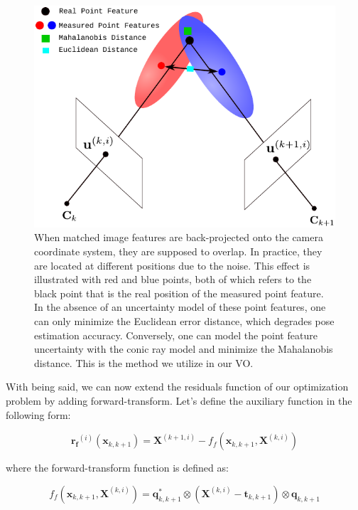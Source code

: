 \documentclass[12pt]{report}
\numberwithin{figure}{section}
\begin{document}
\begin{figure}[H] \centering
\includegraphics[width=0.9\linewidth,natwidth=640,natheight=640]
{fig/drawings/feature_uncertainty.pdf} \caption[Pose Estimation With Feature
Uncertainty] {When matched image features are back-projected onto the camera
coordinate system, they are supposed to overlap. In practice, they are located
at different positions due to the noise. This effect is illustrated with red
and blue points, both of which refers to the black point that is the real
position of the measured point feature. In the absence of an uncertainty model
of these point features, one can only minimize the Euclidean error distance,
which degrades pose estimation accuracy. Conversely, one can model the point
feature uncertainty with the conic ray model and minimize the Mahalanobis
distance. This is the method we utilize in our VO.} \label{fig:min_mahalanobis}
\end{figure}

With being said, we can now extend the residuals function of our optimization
problem by adding forward-transform.  Let's define the auxiliary function in 
the
following form:

\begin{equation} \mathbf{r_{f}}^{(i)}(\mathbf{x}_{k,k+1}) =
\mathbf{X}^{(k+1,i)} - f_f(\mathbf{x}_{k,k+1}, \mathbf{X}^{(k,i)})
\end{equation}

where the forward-transform function is defined as:

\begin{equation} f_f(\mathbf{x}_{k,k+1}, \mathbf{X}^{(k,i)}) =
\mathbf{q}_{k,k+1}^* \otimes (\mathbf{X}^{(k,i)} - \mathbf{t}_{k,k+1})
\otimes \mathbf{q}_{k,k+1} \end{equation}
\end{document}
